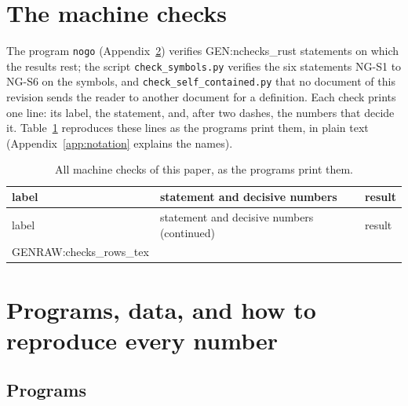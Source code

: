 \section{The machine checks}
\label{app:checks}

The program \texttt{nogo} (Appendix~\ref{app:data}) verifies {{GEN:nchecks_rust}} statements on which
the results rest; the script \texttt{check\_symbols.py} verifies the six statements NG-S1 to NG-S6 on
the symbols, and \texttt{check\_self\_contained.py} that no document of this revision sends the reader to
another document for a definition. Each check prints one line: its label, the statement, and, after two
dashes, the numbers that decide it. Table~\ref{tab:checks} reproduces these lines as the programs print
them, in plain text (Appendix~\ref{app:notation} explains the names).

{\footnotesize
\begin{longtable}{p{}p{}p{}}
\caption{All machine checks of this paper, as the programs print them.}\label{tab:checks}\\
\toprule
label & statement and decisive numbers & result\\
\midrule
\endfirsthead
\toprule
label & statement and decisive numbers (continued) & result\\
\midrule
\endhead
\bottomrule
\endfoot
{{GENRAW:checks_rows_tex}}
\end{longtable}
}

\section{Programs, data, and how to reproduce every number}
\label{app:data}

\subsection{Programs}

